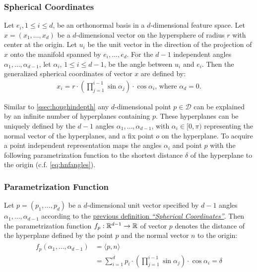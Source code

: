 \subsubsection*{Spherical Coordinates}\label{def:spherecord}
Let $e_i, 1 \leq i \leq d$, be an orthonormal basis in a $d$-dimensional feature space. Let $x=(x_1,\dotsc,x_d)$ be a $d$-dimensional vector on the hypersphere of radius $r$ with center at the origin. Let $u_i$ be the unit vector in the direction of the projection of $x$ onto the manifold spanned by $e_i,\dotsc,e_d$. For the $d-1$ independent angles $\alpha_1,\dotsc,\alpha_{d-1}$, let $\alpha_i$, $1 \leq i \leq d-1$, be the angle between $u_i$ and $e_i$. Then the generalized spherical coordinates of vector $x$ are defined by:
\begin{align}
    x_i = r \cdot (\prod_{j=1}^{i-1}\sin{\alpha_j}) \cdot \cos{\alpha_i}\text{, where } \alpha_d = 0.
\end{align}

Similar to \autoref{ssec:houghindepth} any $d$-dimensional point $p \in \mathcal{D}$ can be explained by an infinite number of hyperplanes containing $p$. These hyperplanes can be uniquely defined by the $d-1$ angles $\alpha_1,\dotsc,\alpha_{d-1}$, with $\alpha_i \in [0,\pi)$ representing the normal vector of the hyperplanes, and a fix point $o$ on the hyperplane. To acquire a point independent representation \textcite{CASHachtert2008robust} maps the angles $\alpha_i$ and point $p$ with the following parametrization function to the shortest distance $\delta$ of the hyperplane to the origin (c.f. \ref{eq:hnfangles}).

\subsubsection*{Parametrization Function}
Let $p = (p_1,\dotsc,p_d)$ be a $d$-dimensional unit vector specified by $d-1$ angles $\alpha_1,\dotsc,\alpha_{d-1}$ according to the \hyperref[def:spherecord]{previous definition \textit{``Spherical Coordinates''}}. Then the parametrization function $f_p:\mathbb{R}^{d-1} \rightarrow \mathbb{R}$ of vector $p$ denotes the distance of the hyperplane defined by the point $p$ and the normal vector $n$ to the origin:
\begin{align}
    \begin{split}
    f_p(\alpha_1,\dotsc,\alpha_{d-1}) &= \langle p,n \rangle \\
    &= \sum_{i=1}^d p_i \cdot (\prod_{j=1}^{i-1} \sin{\alpha_j}) \cdot \cos{\alpha_i} = \delta
    \end{split}
\end{align}

